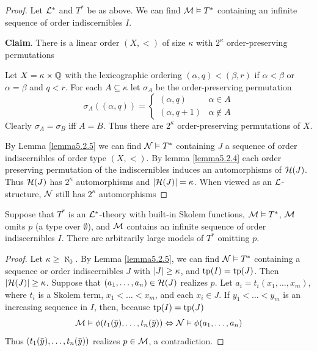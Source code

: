 \documentclass[11pt]{article}
\begin{document}
\begin{proof}
Let \(\mathcal{L}^*\) and \(T^*\) be as above. We can find \(\mathcal{M}\vDash T^*\) containing an infinite sequence of
order indiscernibles \(I\).

\textbf{Claim}. There is a linear order \((X,<)\) of size \(\kappa\) with \(2^\kappa\) order-preserving permutations

Let \(X=\kappa\times\mathbb{Q}\) with the lexicographic ordering \((\alpha,q)<(\beta,r)\) if \(\alpha<\beta\) or \(\alpha=\beta\) and \(q<r\).
For each \(A\subseteq\kappa\) let \(\sigma_A\) be the order-preserving permutation
\begin{equation*}
\sigma_A((\alpha,q))=
\begin{cases}
(\alpha,q)&\alpha\in A\\
(\alpha,q+1)&\alpha\notin A
\end{cases}
\end{equation*}
Clearly \(\sigma_A=\sigma_B\) iff \(A=B\). Thus there are \(2^\kappa\) order-preserving permutations of \(X\).

By Lemma \ref{lemma5.2.5} we can find \(\mathcal{N}\vDash T^*\) containing \(J\) a sequence of order
indiscernibles of order type \((X,<)\). By lemma \ref{lemma5.2.4} each order preserving
permutation of the indiscernibles induces an automorphisms of \(\mathcal{H}(J)\). Thus \(\mathcal{H}(J)\)
has \(2^\kappa\) automorphisms and \(\abs{\calh(J)}=\kappa\). When viewed as an \(\mathcal{L}\)-structure, \(\mathcal{N}\) still
has \(2^\kappa\) automorphisms
\end{proof}

\begin{corollary}[]
Suppose that \(T^*\) is an \(\mathcal{L}^*\)-theory with built-in Skolem functions, \(\mathcal{M}\vDash T^*\), \(\mathcal{M}\)
omits \(p\) (a type over \(\emptyset\)), and \(\mathcal{M}\) contains an infinite sequence of order
indiscernibles \(I\). There are arbitrarily large models of \(T^*\) omitting \(p\).
\end{corollary}

\begin{proof}
Let \(\kappa\ge\aleph_0\). By Lemma \ref{lemma5.2.5}, we can find \(\mathcal{N}\vDash T^*\) containing a sequence or order
indiscernibles \(J\) with \(\abs{J}\ge\kappa\), and \(\operatorname{tp}(I)=\operatorname{tp}(J)\). Then \(\abs{\calh(J)}\ge\kappa\). Suppose
that \((a_1,\dots,a_n)\in\mathcal{H}(J)\) realizes \(p\). Let \(a_i=t_i(x_1,\dots,x_m)\), where \(t_i\) is a Skolem
term, \(x_1<\dots<x_m\), and each \(x_i\in J\). If \(y_1<\dots<y_m\) is an increasing sequence in \(I\),
then, because \(\operatorname{tp}(I)=\operatorname{tp}(J)\)
\begin{equation*}
\calm\vDash\phi(t_1(\bary),\dots,t_n(\bary))\Leftrightarrow\caln\vDash\phi(a_1,\dots,a_n)
\end{equation*}
Thus \((t_1(\bary),\dots,t_n(\bary))\) realizes \(p\in\mathcal{M}\), a contradiction.
\end{proof}
\end{document}
